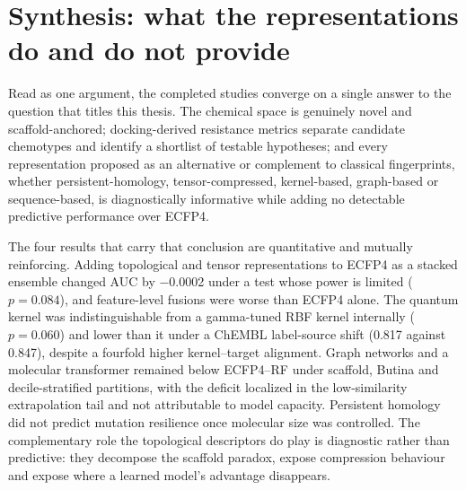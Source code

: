 \section{Synthesis: what the representations do and do not provide}\label{sec:res_synthesis}

Read as one argument, the completed studies converge on a single answer to the question that titles this thesis. The chemical space is genuinely novel and scaffold-anchored; docking-derived resistance metrics separate candidate chemotypes and identify a shortlist of testable hypotheses; and every representation proposed as an alternative or complement to classical fingerprints, whether persistent-homology, tensor-compressed, kernel-based, graph-based or sequence-based, is diagnostically informative while adding no detectable predictive performance over ECFP4.

The four results that carry that conclusion are quantitative and mutually reinforcing. Adding topological and tensor representations to ECFP4 as a stacked ensemble changed AUC by \num{-0.0002} under a test whose power is limited ($p = \num{0.084}$), and feature-level fusions were worse than ECFP4 alone. The quantum kernel was indistinguishable from a gamma-tuned RBF kernel internally ($p = \num{0.060}$) and lower than it under a ChEMBL label-source shift (\num{0.817} against \num{0.847}), despite a fourfold higher kernel--target alignment. Graph networks and a molecular transformer remained below ECFP4--RF under scaffold, Butina and decile-stratified partitions, with the deficit localized in the low-similarity extrapolation tail and not attributable to model capacity. Persistent homology did not predict mutation resilience once molecular size was controlled. The complementary role the topological descriptors do play is diagnostic rather than predictive: they decompose the scaffold paradox, expose compression behaviour and expose where a learned model's advantage disappears.

